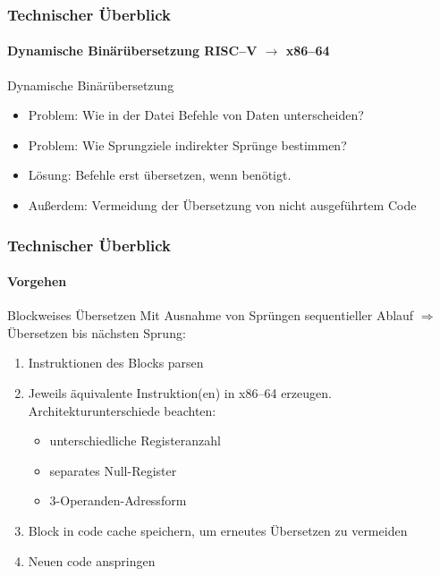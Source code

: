 \documentclass[aspectratio=169, sectionpage=false, german]{tumbeamer}
\newcommand{\conclude}[0]{\ensuremath{\Longrightarrow} }
\newcommand{\refer}[0]{\ensuremath{\rightarrow} }
\begin{document}
\begin{frame}
	\frametitle{Technischer Überblick}

	\framesubtitle {Dynamische Binärübersetzung RISC--V \refer x86--64}
	\begin{block}{Dynamische Binärübersetzung}
		\begin{itemize}
			\item Problem: Wie in der Datei Befehle von Daten unterscheiden?
			\item Problem: Wie Sprungziele indirekter Sprünge bestimmen?
			\item Lösung: Befehle erst übersetzen, wenn benötigt.
			\item Außerdem: Vermeidung der Übersetzung von nicht ausgeführtem Code
		\end{itemize}
	\end{block}
\end{frame}
\begin{frame}
	\frametitle{Technischer Überblick}
	\framesubtitle {Vorgehen}
	\begin{block}{Blockweises Übersetzen}
		Mit Ausnahme von Sprüngen sequentieller Ablauf \conclude Übersetzen bis nächsten Sprung:
		\vspace{0.2cm}
		\begin{enumerate}
			\item Instruktionen des Blocks parsen
			\item Jeweils äquivalente Instruktion(en) in x86--64 erzeugen.\\
			Architekturunterschiede beachten:
			\begin{itemize}
				\item unterschiedliche Registeranzahl
				\item separates Null-Register
				\item 3-Operanden-Adressform
			\end{itemize}
			\item Block in code cache speichern, um erneutes Übersetzen zu vermeiden
			\item Neuen code anspringen
		\end{enumerate}
	\end{block}
\end{frame}
\end{document}
